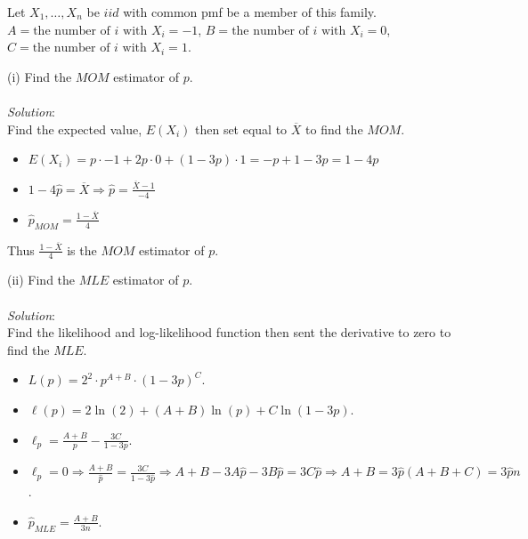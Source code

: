 \documentclass[12pt]{article}
\newcommand{\XB}{\color{black}}
\newcommand{\XBB}{\color{blue}}
\newcommand{\ds}{\displaystyle}
\begin{document}
Let $ X_{1}, \dots , X_{n} $ be  $ iid $ with common pmf be a member of this family. \\

$ A = \text{the number of $i$ with } X_{i} = -1 $, $ B = \text{the number of $i$ with } X_{i} = 0 $, $ C = \text{the number of $i$ with } X_{i} = 1 $. \\

\XBB\hrulefill\XB
\vspace{5mm}

(i) Find the $ MOM $ estimator of $ p $. \\
\vspace{2.5mm} \\
\textit{Solution}:
\vspace{2.5mm} \\

\noindent
Find the expected value, $ E(X_{i}) $ then set equal to $ \overline{X} $ to find the $ MOM $. \\

\begin{itemize}
    \item $ \ds E(X_{i}) = p \cdot -1 + 2p \cdot 0 + (1 - 3p) \cdot 1 = -p + 1 -3p = 1 - 4p $
    \item $ \ds 1 - 4\hat{p} = \overline{X} \Rightarrow \hat{p} = \frac{\overline{X} - 1}{-4} $
    \item $ \ds \hat{p}_{MOM} = \frac{1 - \overline{X}}{4} $
\end{itemize}

\noindent
Thus $ \ds \frac{1 - \overline{X}}{4} $ is the $ MOM $ estimator of $ p $. \\

\vspace{2.5mm}
\newpage

(ii) Find the $ MLE $ estimator of $ p $. \\
\vspace{2.5mm} \\
\textit{Solution}:
\vspace{2.5mm} \\

\noindent
Find the likelihood and log-likelihood function then sent the derivative to zero to find the $ MLE $. \\

\begin{itemize}
    \item $ \ds L(p) = 2^{2} \cdot p^{A + B} \cdot (1 - 3p)^{C} $.
    \item $ \ds \ell(p) = 2\ln(2) + (A + B)\ln(p) + C\ln(1 - 3p) $.
    \item $ \ds \ell_{p} = \frac{A + B}{p} - \frac{3C}{1 - 3p} $.
    \item $ \ds \ell_{p} = 0 \Rightarrow \frac{A + B}{\hat{p}} = \frac{3C}{1 - 3\hat{p}} \Rightarrow A + B - 3A\hat{p} - 3B\hat{p} = 3C\hat{p} \Rightarrow A + B = 3\hat{p}(A + B + C) = 3\hat{p}n $.
    \item $ \ds \hat{p}_{MLE} = \frac{A + B}{3n} $.
\end{itemize}
\end{document}
